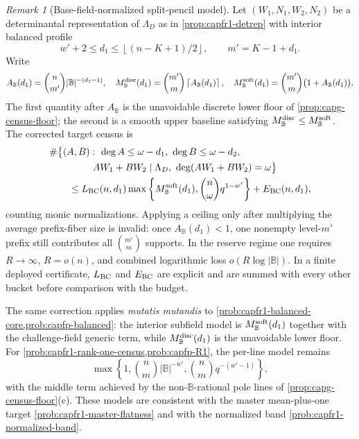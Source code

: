 \documentclass[11pt]{article}
\theoremstyle{definition}
\theoremstyle{remark}
\newtheorem{remark}[remark]{Remark}
\newcommand{\B}{\mathbb{B}}
\providecommand{\ceil}[1]{\left\lceil #1\right\rceil}
\providecommand{\floor}[1]{\left\lfloor #1\right\rfloor}
\begin{document}
\begin{remark}[Base-field-normalized split-pencil model]
\label{prob:capg-split-pencil-B}
Let $(W_1,N_1,W_2,N_2)$ be a determinantal representation of $\Lambda_D$ as in \cref{prop:capfr1-detrep} with interior balanced profile
\[
        w'+2\le d_1\le\floor{(n-K+1)/2},
        \qquad m'=K-1+d_1.
\]
Write
\[
A_{\B}(d_1)=\binom n{m'}|\B|^{-(d_1-1)},\quad
M_{\B}^{\rm disc}(d_1)=\binom{m'}m\ceil{A_{\B}(d_1)},\quad
M_{\B}^{\rm soft}(d_1)=\binom{m'}m\bigl(1+A_{\B}(d_1)\bigr).
\]
The first quantity after $A_{\B}$ is the unavoidable discrete lower floor of \cref{prop:capg-census-floor}; the second is a smooth upper baseline satisfying $M_{\B}^{\rm disc}\le M_{\B}^{\rm soft}$.  The corrected target census is
\[
\begin{aligned}
&\#\bigl\{(A,B):\ \deg A\le\omega-d_1,\ \deg B\le\omega-d_2,\\
&\hspace{4.5em}AW_1+BW_2\mid\Lambda_D,\ \deg(AW_1+BW_2)=\omega\bigr\}\\
&\qquad\le
L_{\rm BC}(n,d_1)
\max\left\{M_{\B}^{\rm soft}(d_1),\binom n\omega q^{1-w'}\right\}
+E_{\rm BC}(n,d_1),
\end{aligned}
\]
counting monic normalizations.  Applying a ceiling only after multiplying the average prefix-fiber size is invalid: once $A_{\B}(d_1)<1$, one nonempty level-$m'$ prefix still contributes all $\binom{m'}m$ supports.  In the reserve regime one requires $R\to\infty$, $R=o(n)$, and combined logarithmic loss $o(R\log|\B|)$.  In a finite deployed certificate, $L_{\rm BC}$ and $E_{\rm BC}$ are explicit and are summed with every other bucket before comparison with the budget.

The same correction applies \emph{mutatis mutandis} to \cref{prob:capfr1-balanced-core,prob:capfp-balanced}: the interior subfield model is $M_{\B}^{\rm soft}(d_1)$ together with the challenge-field generic term, while $M_{\B}^{\rm disc}(d_1)$ is the unavoidable lower floor.  For \cref{prob:capfr1-rank-one-census,prob:capfp-R1}, the per-line model remains
\[
\max\left\{1,\binom nm|\B|^{-w'},\binom nm q^{-(w'-1)}\right\},
\]
with the middle term achieved by the non-$\B$-rational pole lines of \cref{prop:capg-census-floor}(c).  These models are consistent with the master mean-plus-one target \cref{prob:capfr1-master-flatness} and with the normalized band \cref{prob:capfr1-normalized-band}.
\end{remark}
\end{document}
